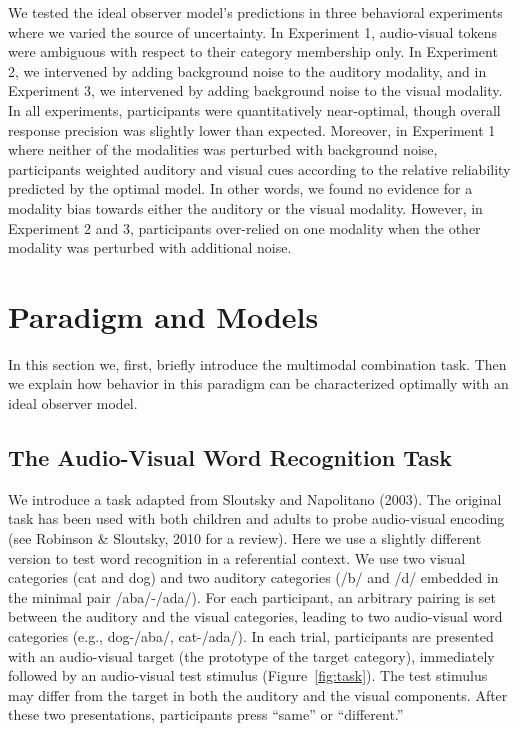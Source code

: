 \documentclass[english,floatsintext,man]{apa6}
\theoremstyle{definition}
\theoremstyle{definition}
\theoremstyle{definition}
\theoremstyle{remark}
\begin{document}
We tested the ideal observer model's predictions in three behavioral
experiments where we varied the source of uncertainty. In Experiment 1,
audio-visual tokens were ambiguous with respect to their category
membership only. In Experiment 2, we intervened by adding background
noise to the auditory modality, and in Experiment 3, we intervened by
adding background noise to the visual modality. In all experiments,
participants were quantitatively near-optimal, though overall response
precision was slightly lower than expected. Moreover, in Experiment 1
where neither of the modalities was perturbed with background noise,
participants weighted auditory and visual cues according to the relative
reliability predicted by the optimal model. In other words, we found no
evidence for a modality bias towards either the auditory or the visual
modality. However, in Experiment 2 and 3, participants over-relied on
one modality when the other modality was perturbed with additional
noise.

\section{Paradigm and Models}\label{paradigm-and-models}

In this section we, first, briefly introduce the multimodal combination
task. Then we explain how behavior in this paradigm can be characterized
optimally with an ideal observer model.

\subsection{The Audio-Visual Word Recognition
Task}\label{the-audio-visual-word-recognition-task}

We introduce a task adapted from Sloutsky and Napolitano (2003). The
original task has been used with both children and adults to probe
audio-visual encoding (see Robinson \& Sloutsky, 2010 for a review).
Here we use a slightly different version to test word recognition in a
referential context. We use two visual categories (cat and dog) and two
auditory categories (/b/ and /d/ embedded in the minimal pair
/aba/-/ada/). For each participant, an arbitrary pairing is set between
the auditory and the visual categories, leading to two audio-visual word
categories (e.g., dog-/aba/, cat-/ada/). In each trial, participants are
presented with an audio-visual target (the prototype of the target
category), immediately followed by an audio-visual test stimulus
(Figure~\ref{fig:task}). The test stimulus may differ from the target in
both the auditory and the visual components. After these two
presentations, participants press \enquote{same} or \enquote{different.}
\end{document}
